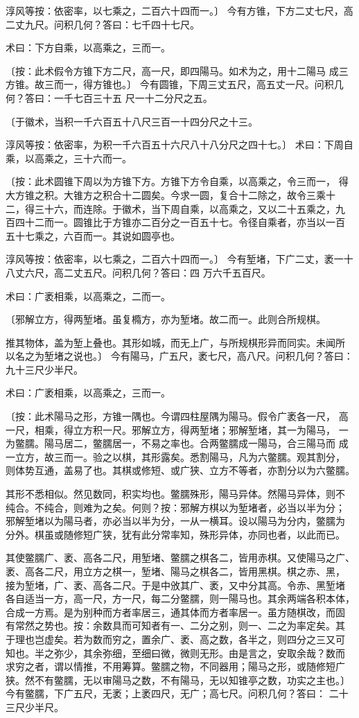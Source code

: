 \documentclass[a4paper,12pt,UTF8,twoside]{ctexbook}
\begin{document}
淳风等按：依密率，以七乘之，二百六十四而一。〕 今有方锥，下方二丈七尺，高二丈九尺。问积几何？答曰：七千四十七尺。

术曰：下方自乘，以高乘之，三而一。

〔按：此术假令方锥下方二尺，高一尺，即四陽马。如术为之，用十二陽马 成三方锥。故三而一，得方锥也。〕 今有圆锥，下周三丈五尺，高五丈一尺。问积几何？答曰：一千七百三十五 尺一十二分尺之五。

〔于徽术，当积一千六百五十八尺三百一十四分尺之十三。

淳风等按：依密率，为积一千六百五十六尺八十八分尺之四十七。〕 术曰：下周自乘，以高乘之，三十六而一。

〔按：此术圆锥下周以为方锥下方。方锥下方令自乘，以高乘之，令三而一， 得大方锥之积。大锥方之积合十二圆矣。今求一圆，复合十二除之，故令三乘十 二，得三十六，而连除。于徽术，当下周自乘，以高乘之，又以二十五乘之，九 百四十二而一。圆锥比于方锥亦二百分之一百五十七。令径自乘者，亦当以一百 五十七乘之，六百而一。其说如圆亭也。

淳风等按：依密率，以七乘之，二百六十四而一。〕 今有堑堵，下广二丈，袤一十八丈六尺，高二丈五尺。问积几何？答曰：四 万六千五百尺。

术曰：广袤相乘，以高乘之，二而一。

〔邪解立方，得两堑堵。虽复橢方，亦为堑堵。故二而一。此则合所规棋。

推其物体，盖为堑上叠也。其形如城，而无上广，与所规棋形异而同实。未闻所 以名之为堑堵之说也。〕 今有陽马，广五尺，袤七尺，高八尺。问积几何？答曰：九十三尺少半尺。

术曰：广袤相乘，以高乘之，三而一。

〔按：此术陽马之形，方锥一隅也。今谓四柱屋隅为陽马。假令广袤各一尺， 高一尺，相乘，得立方积一尺。邪解立方，得两堑堵；邪解堑堵，其一为陽马， 一为鳖臑。陽马居二，鳖臑居一，不易之率也。合两鳖臑成一陽马，合三陽马而 成一立方，故三而一。验之以棋，其形露矣。悉割陽马，凡为六鳖臑。观其割分， 则体势互通，盖易了也。其棋或修短、或广狭、立方不等者，亦割分以为六鳖臑。

其形不悉相似。然见数同，积实均也。鳖臑殊形，陽马异体。然陽马异体，则不 纯合。不纯合，则难为之矣。何则？按：邪解方棋以为堑堵者，必当以半为分； 邪解堑堵以为陽马者，亦必当以半为分，一从一横耳。设以陽马为分内，鳖臑为 分外。棋虽或随修短广狭，犹有此分常率知，殊形异体，亦同也者，以此而已。

其使鳖臑广、袤、高各二尺，用堑堵、鳖臑之棋各二，皆用赤棋。又使陽马之广、 袤、高各二尺，用立方之棋一，堑堵、陽马之棋各二，皆用黑棋。棋之赤、黑， 接为堑堵，广、袤、高各二尺。于是中攽其广、袤，又中分其高。令赤、黑堑堵 各自适当一方，高一尺，方一尺，每二分鳖臑，则一陽马也。其余两端各积本体， 合成一方焉。是为别种而方者率居三，通其体而方者率居一。虽方随棋改，而固 有常然之势也。按：余数具而可知者有一、二分之别，则一、二之为率定矣。其 于理也岂虚矣。若为数而穷之，置余广、袤、高之数，各半之，则四分之三又可 知也。半之弥少，其余弥细，至细曰微，微则无形。由是言之，安取余哉？数而 求穷之者，谓以情推，不用筹算。鳖臑之物，不同器用；陽马之形，或随修短广 狭。然不有鳖臑，无以审陽马之数，不有陽马，无以知锥亭之数，功实之主也。〕 今有鳖臑，下广五尺，无袤；上袤四尺，无广；高七尺。问积几何？答曰： 二十三尺少半尺。
\end{document}
